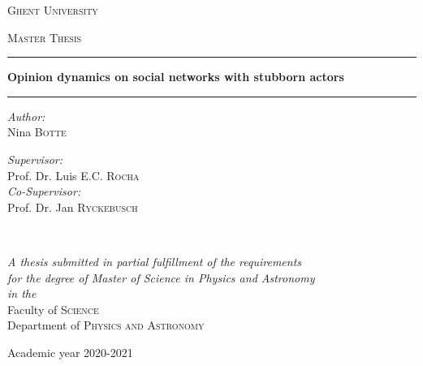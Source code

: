 \documentclass[11 pt , letterpaper , twoside , openright]{book}
\begin{document}
\frontmatter
{}

\begin{titlepage}
\begin{center}

\vspace*{.06\textheight}
{\scshape\LARGE \textcolor{NavyBlue}{Ghent University}\par}\vspace{1.5cm} %
\textsc{\Large Master Thesis}\\[0.5cm] %

\hrule %
\vspace{0.4cm} 
{\huge \bfseries Opinion dynamics on social networks with stubborn actors\par}\vspace{0.4cm} %
\hrule %
\vspace{1.5cm} 
 
\begin{minipage}[t]{0.4\textwidth}
\begin{flushleft} \large
\emph{Author:}\\
\textcolor{NavyBlue}{Nina \textsc{Botte}} %
\end{flushleft}
\end{minipage}
\begin{minipage}[t]{0.4\textwidth}
\begin{flushright} \large
\emph{Supervisor:} \\
\textcolor{NavyBlue}{Prof. Dr. Luis E.C. \textsc{Rocha}}\\
\emph{Co-Supervisor:}\\
\textcolor{NavyBlue}{Prof. Dr. Jan \textsc{Ryckebusch}}
\end{flushright}
\end{minipage}\\[3cm]
 
\vfill

\large \textit{A thesis submitted in partial fulfillment of the requirements\\ for the degree of Master of Science in Physics and Astronomy}\\[0.3cm] %
\textit{in the}\\[0.4cm]
\textcolor{NavyBlue}{Faculty of \textsc{Science}}\\\textcolor{NavyBlue}{Department of \textsc{Physics and Astronomy}}\\[2cm] %
 
\vfill

{\large Academic year 2020-2021}\\[4cm] %
\vfill
\end{center}
\end{titlepage}
\end{document}

